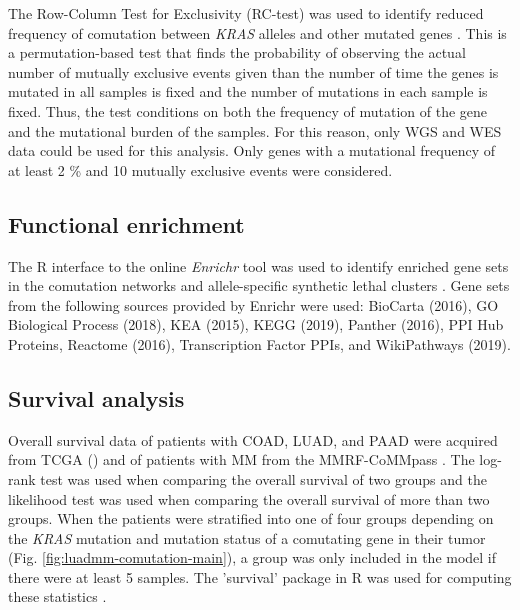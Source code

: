 \documentclass[english, 10pt, letterpaper]{article}
\newcommand{\KRAS}{\emph{KRAS}}
\begin{document}
The Row-Column Test for Exclusivity (RC-test) was used to identify reduced frequency of comutation between \KRAS{} alleles and other mutated genes \cite{Leiserson2016}. 
This is a permutation-based test that finds the probability of observing the actual number of mutually exclusive events given than the number of time the genes is mutated in all samples is fixed and the number of mutations in each sample is fixed.
Thus, the test conditions on both the frequency of mutation of the gene and the mutational burden of the samples.
For this reason, only WGS and WES data could be used for this analysis.
Only genes with a mutational frequency of at least 2 \% and 10 mutually exclusive events were considered.


\subsection*{Functional enrichment}
The R interface to the online \emph{Enrichr} tool was used to identify enriched gene sets in the comutation networks and allele-specific synthetic lethal clusters \cite{Chen2013, Kuleshov2016Enrichr:Update., R-enrichR}.
Gene sets from the following sources provided by Enrichr were used: BioCarta (2016), GO Biological Process (2018), KEA (2015), KEGG (2019), Panther (2016), PPI Hub Proteins, Reactome (2016), Transcription Factor PPIs, and WikiPathways (2019).


\subsection*{Survival analysis}
Overall survival data of patients with COAD, LUAD, and PAAD were acquired from TCGA (\cite{CancerGenomeAtlasNetwork2012, CancerGenomeAtlasResearchNetwork2014, CancerGenomeAtlasResearchNetwork.Electronicaddress:andrew_aguirredfci.harvard.edu2017}) and of patients with MM from the MMRF-CoMMpass \cite{Walker2019AAnalysis.}.
The log-rank test was used when comparing the overall survival of two groups and the likelihood test was used when comparing the overall survival of more than two groups.
When the patients were stratified into one of four groups depending on the \KRAS{} mutation and mutation status of a comutating gene in their tumor (Fig. \ref{fig:luadmm-comutation-main}), a group was only included in the model if there were at least 5 samples.
The 'survival' package in R was used for computing these statistics \cite{survival-package}.
\end{document}
